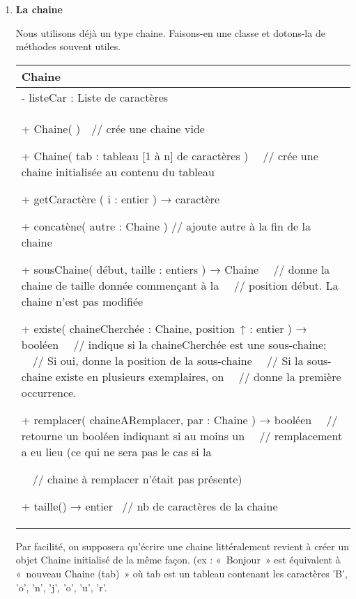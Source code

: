 	\liststyleExercice
	\setcounter{saveenum}{\value{enumi}}
	\begin{enumerate}
	\setcounter{enumi}{\value{saveenum}}
		\item {\sffamily\bfseries
		La chaine}
		
			Nous utilisons déjà un type chaine.
			Faisons-en une classe et dotons-la de
			méthodes souvent utiles.

			\begin{center}
			\tablehead{}
			\begin{supertabular}{|m{11.597cm}|}
			\hline
			\centering\arraybslash  Chaine\\\hline
			 {}- listeCar : Liste de caractères\\\hline
			{ + Chaine( )\ \ // crée une chaine vide}

			{ {+ }Chaine( tab : tableau [1 à n] de caractères )
			\ \ // crée une chaine initialisée au contenu du tableau}

			{ {+ getCaractère ( i : entier ) }\textsf{→} {caractère}}

			{ + concatène( autre : Chaine ) // ajoute autre à
			la fin de la chaine}

			{ {+ sousChaine( début,
			taille : entiers ) }\textsf{→} {Chaine
			\ \ // donne la chaine de taille donnée commençant à la
			\ \ // position début. La chaine n'est pas modifiée}}

			{ {+ existe(
			chaineCherchée : Chaine, position~}\textsf{↑}
			:{ entier ) }\textsf{→}
			{booléen
			\ \ // indique si la chaineCherchée est une sous-chaine;
			\ \ // Si oui, donne la position de la sous-chaine
			\ \ // Si la sous-chaine existe en plusieurs exemplaires, on
			\ \ // donne la première occurrence.}}

			{ {+ remplacer(
			chaineARemplacer, par : Chaine ) }\textsf{→}
			{booléen
			\ \ // retourne un booléen indiquant si au moins un
			\ \ // remplacement a eu lieu (ce qui ne sera pas le cas si la}}

			{ \ \ // chaine à remplacer n’était pas
			présente)}

			 {+ taille() }\textsf{→}
			{entier \ // nb de caractères de la
			chaine}\\\hline
			\end{supertabular}
			\end{center}
			
			Par facilité, on supposera qu’écrire une chaine littéralement revient à
			créer un objet Chaine initialisé de la même façon. (ex : «~Bonjour~»
			est équivalent à «~nouveau Chaine (tab)~» où tab est un tableau
			contenant les caractères 'B',
			'o',
			'n',
			'j',
			'o',
			'u',
			'r'.


\end{enumerate}
